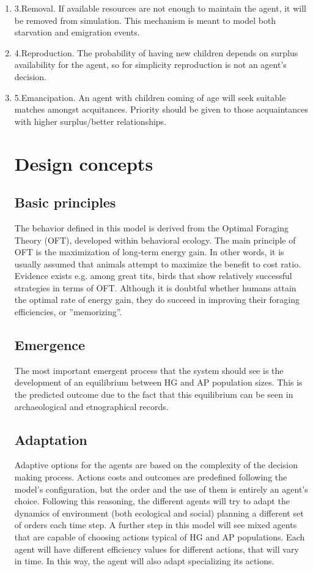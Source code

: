 \begin{enumerate}
\begin{enumerate}
\begin{enumeration}
\begin{enumerate}
\begin{enumerate}
\begin{enumerate}
\item 3.Removal. If available resources are not enough to maintain the agent, it will be removed from
simulation. This mechanism is meant to model both starvation and emigration events.
\item 4.Reproduction. The probability of having new children depends on surplus availability for the
agent, so for simplicity reproduction is not an agent's decision.
\item 5.Emancipation. An agent with children coming of age will seek suitable matches amongst
acquitances. Priority should be given to those acquaintances with higher surplus/better
relationships.



\section{Design concepts}

\subsection{Basic principles}
The behavior defined in this model is derived from the Optimal Foraging Theory (OFT), developed
within behavioral ecology. The main principle of OFT is the maximization of long-term energy gain. In
other words, it is usually assumed that animals attempt to maximize the benefit to cost ratio. Evidence
exists e.g. among great tits, birds that show relatively successful strategies in terms of OFT. Although
it is doubtful whether humans attain the optimal rate of energy gain, they do succeed in improving their
foraging efficiencies, or ”memorizing”.

\subsection{Emergence}
The most important emergent process that the system should see is the development of an
equilibrium between HG and AP population sizes. This is the predicted outcome due to the fact that
this equilibrium can be seen in archaeological and etnographical records.

\subsection{Adaptation}
Adaptive options for the agents are based on the complexity of the decision making process. Actions
costs and outcomes are predefined following the model's configuration, but the order and the use of
them is entirely an agent's choice. Following this reasoning, the different agents will try to adapt the
dynamics of environment (both ecological and social) planning a different set of orders each time step.
A further step in this model will see mixed agents that are capable of choosing actions typical of HG
and AP populations. Each agent will have different efficiency values for different actions, that will vary
in time. In this way, the agent will also adapt specializing its actions.


\end{enumerate}
\end{enumerate}
\end{enumerate}
\end{enumeration}
\end{enumerate}
\end{enumerate}
